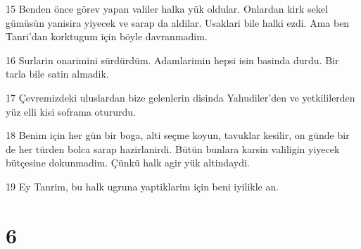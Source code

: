 \par 15 Benden önce görev yapan valiler halka yük oldular. Onlardan kirk sekel gümüsün yanisira yiyecek ve sarap da aldilar. Usaklari bile halki ezdi. Ama ben Tanri'dan korktugum için böyle davranmadim.
\par 16 Surlarin onarimini sürdürdüm. Adamlarimin hepsi isin basinda durdu. Bir tarla bile satin almadik.
\par 17 Çevremizdeki uluslardan bize gelenlerin disinda Yahudiler'den ve yetkililerden yüz elli kisi soframa otururdu.
\par 18 Benim için her gün bir boga, alti seçme koyun, tavuklar kesilir, on günde bir de her türden bolca sarap hazirlanirdi. Bütün bunlara karsin valiligin yiyecek bütçesine dokunmadim. Çünkü halk agir yük altindaydi.
\par 19 Ey Tanrim, bu halk ugruna yaptiklarim için beni iyilikle an.

\chapter{6}

